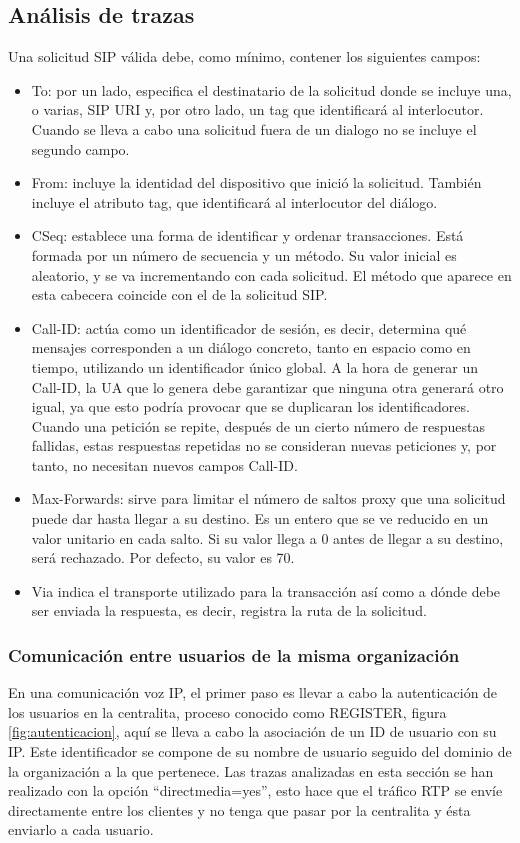 \documentclass[a4paper]{article}
\begin{document}
\subsection{Análisis de trazas}
Una solicitud SIP válida debe, como mínimo, contener los siguientes campos:
\begin{itemize}
    \item To: por un lado, especifica el destinatario de la solicitud donde se incluye una, o varias, SIP URI y, por otro lado, un tag que identificará al interlocutor. Cuando se lleva a cabo una solicitud fuera de un dialogo no se incluye el segundo campo.
    \item From: incluye la identidad del dispositivo que inició la solicitud. También incluye el atributo tag, que identificará al interlocutor del diálogo.
    
    \item CSeq: establece una forma de identificar y ordenar transacciones. Está formada por un número de secuencia y un método. Su valor inicial es aleatorio, y se va incrementando con cada solicitud. El método que aparece en esta cabecera coincide con el de la solicitud SIP.
    
    \item Call-ID: actúa como un identificador de sesión, es decir, determina qué mensajes corresponden a un diálogo concreto, tanto en espacio como en tiempo, utilizando un identificador único global. A la hora de generar un Call-ID, la UA que lo genera debe garantizar que ninguna otra generará otro igual, ya que esto podría provocar que se duplicaran los identificadores. Cuando una petición se repite, después de un cierto número de respuestas fallidas, estas respuestas repetidas no se consideran nuevas peticiones y, por tanto, no necesitan nuevos campos Call-ID.
    
    \item Max-Forwards: sirve para limitar el número de saltos proxy que una solicitud puede dar hasta llegar a su destino. Es un entero que se ve reducido en un valor unitario en cada salto. Si su valor llega a 0 antes de llegar a su destino, será rechazado. Por defecto, su valor es 70.
    \item Via indica el transporte utilizado para la transacción así como a dónde debe ser enviada la respuesta, es decir, registra la ruta de la solicitud.
\end{itemize}
\subsubsection{Comunicación entre usuarios de la misma organización}
En una comunicación voz IP, el primer paso es llevar a cabo la autenticación de los usuarios en la centralita, proceso conocido como REGISTER, figura \ref{fig:autenticacion}, aquí se lleva a cabo la asociación de un ID de usuario con su IP. Este identificador se compone de su nombre de usuario seguido del dominio de la organización a la que pertenece. Las trazas analizadas en esta sección se han realizado con la opción ``directmedia=yes'', esto hace que el tráfico RTP se envíe directamente entre los clientes y no tenga que pasar por la centralita y ésta enviarlo a cada usuario. 
\end{document}
